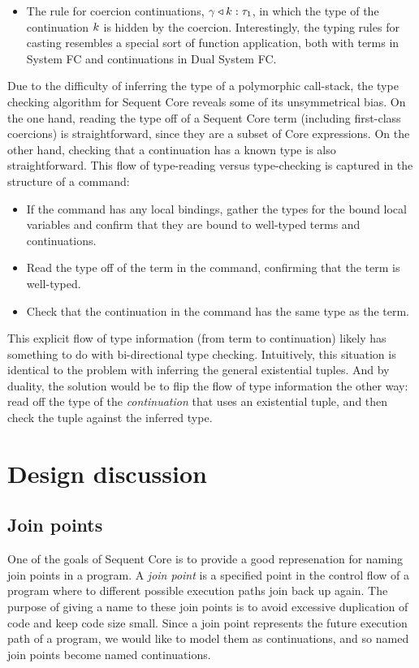 \documentclass{article}
\begin{document}
\begin{itemize}
\item The rule for coercion continuations, ${\gamma}\triangleleft{k} : \tau_1$, in which
  the type of the continuation $k$ is hidden by the coercion.  Interestingly,
  the typing rules for casting resembles a special sort of function application,
  both with terms in System FC and continuations in Dual System FC.
\end{itemize}

Due to the difficulty of inferring the type of a polymorphic call-stack, the
type checking algorithm for Sequent Core reveals some of its unsymmetrical bias.
On the one hand, reading the type off of a Sequent Core term (including
first-class coercions) is straightforward, since they are a subset of Core
expressions.  On the other hand, checking that a continuation has a known type
is also straightforward.  This flow of type-reading versus type-checking is
captured in the structure of a command:
\begin{itemize}
\item If the command has any local bindings, gather the types for the bound
  local variables and confirm that they are bound to well-typed terms and
  continuations.
\item Read the type off of the term in the command, confirming that the term is
  well-typed.
\item Check that the continuation in the command has the same type as the term.
\end{itemize}
This explicit flow of type information (from term to continuation) likely has
something to do with bi-directional type checking.  Intuitively, this situation
is identical to the problem with inferring the general existential tuples.  And
by duality, the solution would be to flip the flow of type information the other
way: read off the type of the \emph{continuation} that uses an existential
tuple, and then check the tuple against the inferred type.

\section{Design discussion}
\label{sec:design-discussion}

\subsection{Join points}

One of the goals of Sequent Core is to provide a good represenation for naming
join points in a program.  A \emph{join point} is a specified point in the
control flow of a program where to different possible execution paths join back
up again.  The purpose of giving a name to these join points is to avoid
excessive duplication of code and keep code size small.  Since a join point
represents the future execution path of a program, we would like to model them
as continuations, and so named join points become named continuations.
\end{document}
